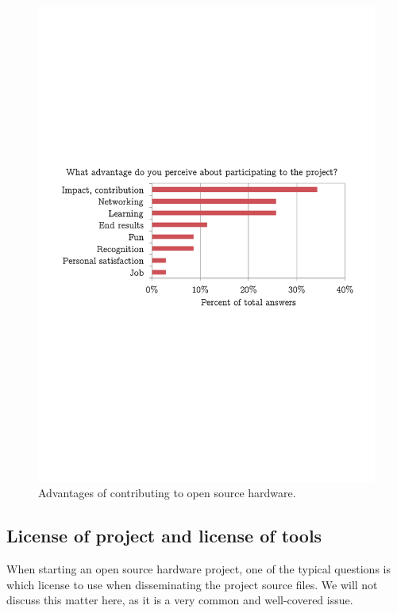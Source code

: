 \documentclass[letterpaper, 10 pt, conference]{ieeeconf}  %
\begin{document}
\begin{figure}
\centering
\includegraphics[width=\columnwidth]{figures/advantages}
\caption{Advantages of contributing to open source hardware.}
\label{fig:getout}
\end{figure}

\subsection{License of project and license of tools}

When starting an open source hardware project, one of the typical questions is which license to use when disseminating the project source files. 
We will not discuss this matter here, as it is a very common and well-covered issue. 
\end{document}
